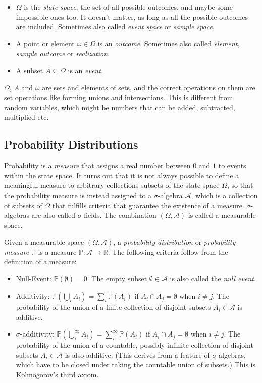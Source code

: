 \begin{itemize}
\item $\Omega$ is the \textit{state space}, the set of all possible outcomes, and maybe some impossible ones too. It doesn't matter, as long as all the possible outcomes are included. Sometimes also called \textit{event space} or \textit{sample space}. 
\item A point or element $\omega \in \Omega$ is an \textit{outcome}. Sometimes also called \textit{element}, \textit{sample outcome} or \textit{realization}. 
\item A subset $A \subseteq \Omega$ is an \textit{event}. 
\end{itemize}

$\Omega$, $A$ and $\omega$ are sets and elements of sets, and the correct operations on them are set operations like forming unions and intersections. This is different from random variables, which might be numbers that can be added, subtracted, multiplied etc.

\subsection{Probability Distributions}
Probability is a \textit{measure} that assigns a real number between $0$ and $1$ to events within the state space. It turns out that it is not always possible to define a meaningful measure to arbitrary collections subsets of the state space $\Omega$, so that the probability measure is instead assigned to a $\sigma$-algebra $\mathscr{A}$, which is a collection of subsets of $\Omega$ that fulfills criteria that guarantee the existence of a measure. $\sigma$-algebras are also called $\sigma$-fields. The combination $(\Omega, \mathscr{A})$ is called a measurable space. 

Given a measurable space $(\Omega, \mathscr{A})$, a \textit{probability distribution} or \textit{probability measure} $\mathbb{P}$ is a measure $\mathbb{P}:\mathscr{A} \rightarrow \mathbb{R}$. The following criteria follow from the definition of a measure: 

\begin{itemize}
\item Null-Event: $\mathbb{P}(\emptyset) = 0$. The empty subset $\emptyset \in \mathscr{A}$ is also called the \textit{null event}.
\item Additivity: $\mathbb{P}(\bigcup_i A_i) = \sum_i \mathbb{P}(A_i)$ if $A_i \cap A_j = \emptyset$  when $i \neq j$. The probability of the union of a finite collection of disjoint subsets $A_i \in \mathscr{A}$ is additive. 
\item $\sigma$-additivity: $\mathbb{P}(\bigcup^{\infty}_i A_i) = \sum^{\infty}_i \mathbb{P}(A_i)$ if $A_i \cap A_j = \emptyset$  when $i \neq j$. The probability of the union of a countable, possibly infinite collection of disjoint subsets $A_i \in \mathscr{A}$ is also additive. (This derives from a feature of $\sigma$-algebras, which have to be closed under taking the countable union of subsets.) This is Kolmogorov's third axiom.
\end{itemize} 


